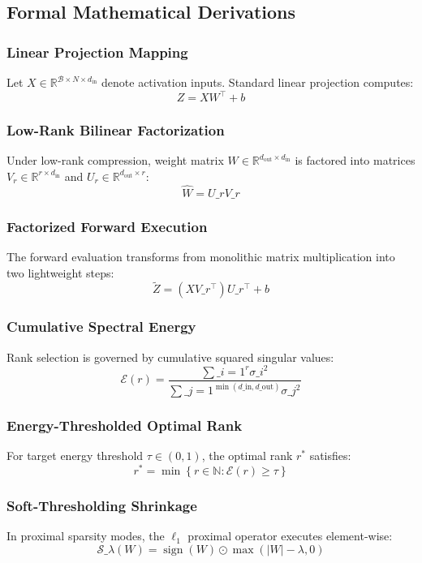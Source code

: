 \subsection{Formal Mathematical Derivations}

\subsubsection{Linear Projection Mapping}
Let $X \in \mathbb{R}^{\mathcal{B} \times N \times d_{\text{in}}}$ denote activation inputs. Standard linear projection computes:
\[
Z = X W^\top + b
\]

\subsubsection{Low-Rank Bilinear Factorization}
Under low-rank compression, weight matrix $W \in \mathbb{R}^{d_{\text{out}} \times d_{\text{in}}}$ is factored into matrices $V_r \in \mathbb{R}^{r \times d_{\text{in}}}$ and $U_r \in \mathbb{R}^{d_{\text{out}} \times r}$:
\[
\hat{W} = U\_r V\_r
\]

\subsubsection{Factorized Forward Execution}
The forward evaluation transforms from monolithic matrix multiplication into two lightweight steps:
\[
\tilde{Z} = (X V\_r^\top) U\_r^\top + b
\]

\subsubsection{Cumulative Spectral Energy}
Rank selection is governed by cumulative squared singular values:
\[
\mathcal{E}(r) = \frac{\sum\_{i=1}^{r} \sigma\_i^2}{\sum\_{j=1}^{\min(d\_{\text{in}}, d\_{\text{out}})} \sigma\_j^2}
\]

\subsubsection{Energy-Thresholded Optimal Rank}
For target energy threshold $\tau \in (0, 1)$, the optimal rank $r^*$ satisfies:
\[
r^* = \min \left\{ r \in \mathbb{N} : \mathcal{E}(r) \ge \tau \right\}
\]

\subsubsection{Soft-Thresholding Shrinkage}
In proximal sparsity modes, the $\ell_1$ proximal operator executes element-wise:
\[
\mathcal{S}\_\lambda(W) = \operatorname{sign}(W) \odot \max(|W| - \lambda, 0)
\]

